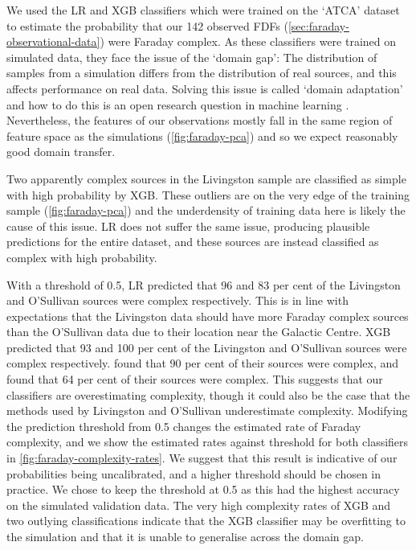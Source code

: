     We used the LR and XGB classifiers which were trained on the `ATCA' dataset to estimate the probability that our 142 observed FDFs (\autoref{sec:faraday-observational-data}) were Faraday complex. As these classifiers were trained on simulated data, they face the issue of the `domain gap': The distribution of samples from a simulation differs from the distribution of real sources, and this affects performance on real data. Solving this issue is called `domain adaptation' and how to do this is an open research question in machine learning \citep{zhang2019transfer,pan10transfer}. Nevertheless, the features of our observations mostly fall in the same region of feature space as the simulations (\autoref{fig:faraday-pca}) and so we expect reasonably good domain transfer.

    Two apparently complex sources in the Livingston sample are classified as simple with high probability by XGB. These outliers are on the very edge of the training sample (\autoref{fig:faraday-pca}) and the underdensity of training data here is likely the cause of this issue. LR does not suffer the same issue, producing plausible predictions for the entire dataset, and these sources are instead classified as complex with high probability.

    With a threshold of 0.5, LR predicted that 96 and 83 per cent of the Livingston and O'Sullivan sources were complex respectively. This is in line with expectations that the Livingston data should have more Faraday complex sources than the O'Sullivan data due to their location near the Galactic Centre. XGB predicted that 93 and 100 per cent of the Livingston and O'Sullivan sources were complex respectively. \citet{livingston21faraday} found that 90 per cent of their sources were complex, and \citet{osullivan_broad-band_2017} found that 64 per cent of their sources were complex. This suggests that our classifiers are overestimating complexity, though it could also be the case that the methods used by Livingston and O'Sullivan underestimate complexity. Modifying the prediction threshold from 0.5 changes the estimated rate of Faraday complexity, and we show the estimated rates against threshold for both classifiers in \autoref{fig:faraday-complexity-rates}. We suggest that this result is indicative of our probabilities being uncalibrated, and a higher threshold should be chosen in practice. We chose to keep the threshold at 0.5 as this had the highest accuracy on the simulated validation data. The very high complexity rates of XGB and two outlying classifications indicate that the XGB classifier may be overfitting to the simulation and that it is unable to generalise across the domain gap.


